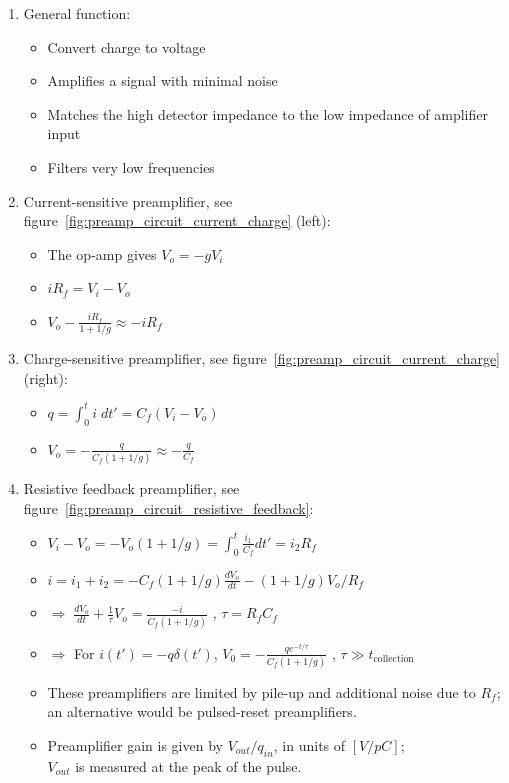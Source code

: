 \begin{enumerate}
    \item General function:
    \begin{itemize}
        \item Convert charge to voltage
        \item Amplifies a signal with minimal noise
        \item Matches the high detector impedance to the low impedance of amplifier input
        \item Filters very low frequencies
    \end{itemize}
    \item Current-sensitive preamplifier, see figure~\ref{fig:preamp_circuit_current_charge} (left):
    \begin{itemize}
        \item[] The op-amp gives $V_o=-gV_i$
        \item[] $iR_f=V_i-V_o$
        \item[] $V_o-\frac{iR_f}{1+1/g}\approx-iR_f$
    \end{itemize}
    \item Charge-sensitive preamplifier, see figure~\ref{fig:preamp_circuit_current_charge} (right):
    \begin{itemize}
        \item[] $q=\int_0^ti\;dt'=C_f(V_i-V_o)$
        \item[] $V_o=-\frac{q}{C_f(1+1/g)}\approx-\frac{q}{C_f}$
    \end{itemize}
    \item Resistive feedback preamplifier, see figure~\ref{fig:preamp_circuit_resistive_feedback}:
    \begin{itemize}
        \item[] $V_i-V_o=-V_o(1+1/g)=\int_0^t\frac{i_1}{C_f}dt'=i_2R_f$
        \item[] $i=i_1+i_2=-C_f(1+1/g)\frac{dV_o}{dt}-(1+1/g)V_o/R_f$
        \item[] $\Rightarrow\; \frac{dV_o}{dt}+\frac{1}{\tau}V_o=\frac{-i}{C_f(1+1/g)}$ , $\tau=R_fC_f$
        \item[] $\Rightarrow$ For $i(t')=-q\delta(t')$, $V_0=-\frac{qe^{-t/\tau}}{C_f(1+1/g)}$ , $\tau\gg t_\text{collection}$
        \item These preamplifiers are limited by pile-up and additional noise due to $R_f$; an alternative would be pulsed-reset preamplifiers.
        \item Preamplifier gain is given by $V_{out}/q_{in}$, in units of $[V/pC]$;\\
        $V_{out}$ is measured at the peak of the pulse.
    \end{itemize}
\end{enumerate}
